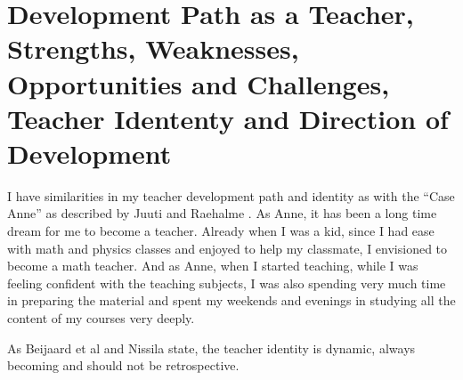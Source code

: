 \section{ Development Path as a Teacher, Strengths, Weaknesses, Opportunities and Challenges, Teacher Idententy and Direction of Development}

I have similarities in my teacher development path and identity as with the ``Case Anne'' as described by Juuti and Raehalme \cite{juuti_2013}. 
As Anne, it has been a long time dream for me to become a teacher. 
Already when I was a kid, since I had ease with math and physics classes and enjoyed to help my classmate, I envisioned to become a math teacher.
And as Anne, when I started teaching, while I was feeling confident with the teaching subjects, I was also spending very much time in preparing the material and spent my weekends and evenings in studying all the content of my courses very deeply.

As Beijaard et al \cite{Beijaard_2004} and Nissila \cite{nissila_2013} state, the teacher identity is dynamic, always becoming and should not be retrospective. 

  
  
  
  
